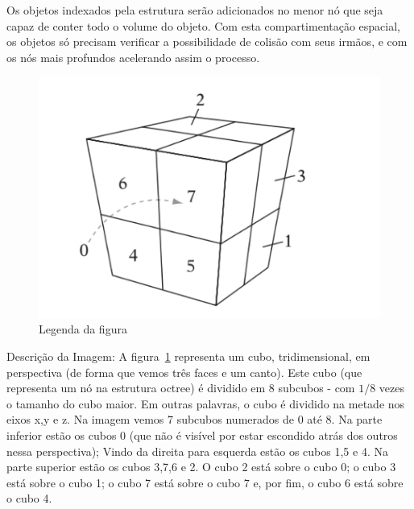 Os objetos indexados pela estrutura serão adicionados no menor nó que seja capaz de conter todo o volume do objeto.
Com esta compartimentação espacial, os objetos só precisam verificar a possibilidade de colisão com seus irmãos, e com os nós mais profundos acelerando assim o processo.

\begin{figure}[htb]
  \centering
	\caption{\label{fig:figura1} Legenda da figura}
	\includegraphics[scale=0.5]{Imagens/Figura_7.10.png} %
\end{figure}

\noindent\footnotesize Descrição da Imagem: A figura~\ref{fig:figura1} representa um cubo, tridimensional, em perspectiva (de forma que vemos três faces e um canto). Este cubo (que representa um nó na estrutura octree) é dividido em 8 subcubos - com $1/8$ vezes o tamanho do cubo maior. Em outras palavras, o cubo é dividido na metade nos eixos x,y e z.
\noindent\footnotesize Na imagem vemos 7 subcubos numerados de 0 até 8. Na parte inferior estão os cubos 0 (que não é visível por estar escondido atrás dos outros nessa perspectiva); Vindo da direita para esquerda estão os cubos 1,5 e 4. Na parte superior estão os cubos 3,7,6 e 2. O cubo 2 está sobre o cubo 0; o cubo 3 está sobre o cubo 1; o cubo 7 está sobre o cubo 7 e, por fim, o cubo 6 está sobre o cubo 4.

